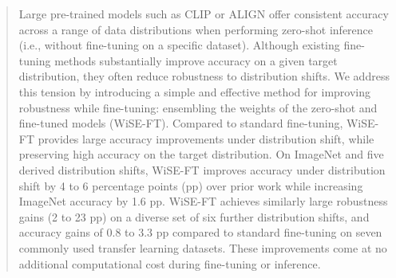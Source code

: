 \begin{abstract}
Large pre-trained models such as CLIP or ALIGN offer consistent accuracy across a range of data distributions when performing zero-shot inference (i.e., without fine-tuning on a specific dataset).  
Although existing fine-tuning methods substantially improve accuracy on a given target distribution, they often reduce robustness to distribution shifts.  
We address this tension by introducing a simple and effective method for improving robustness while fine-tuning:  ensembling the weights of the zero-shot and fine-tuned models (WiSE-FT). 
Compared to standard fine-tuning, WiSE-FT provides large accuracy improvements under distribution shift, while  preserving high accuracy on the target distribution.  
On ImageNet and five derived distribution shifts, WiSE-FT improves accuracy under distribution shift by 4 to 6 percentage points (pp) over prior work while increasing ImageNet accuracy by 1.6 pp. 
WiSE-FT achieves similarly large robustness gains (2 to 23 pp) on a diverse set of six further distribution shifts, and accuracy gains of 0.8 to 3.3 pp compared to standard fine-tuning on seven commonly used transfer learning datasets. 
These improvements come at no additional computational cost during fine-tuning or inference.
\end{abstract}
